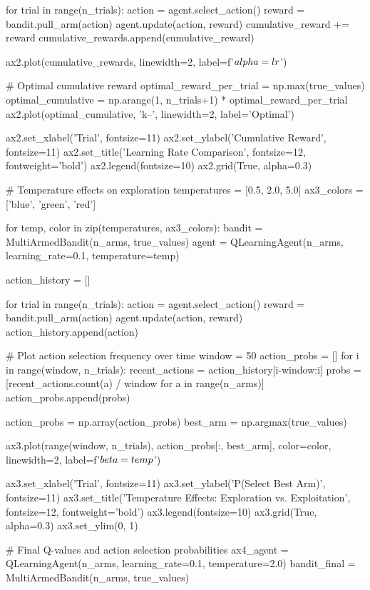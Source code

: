 \documentclass[a4paper, 11pt]{article}
\begin{document}
{{\begin{pycode}
    for trial in range(n_trials):
        action = agent.select_action()
        reward = bandit.pull_arm(action)
        agent.update(action, reward)
        cumulative_reward += reward
        cumulative_rewards.append(cumulative_reward)

    ax2.plot(cumulative_rewards, linewidth=2, label=f'$\\alpha={lr}$')

# Optimal cumulative reward
optimal_reward_per_trial = np.max(true_values)
optimal_cumulative = np.arange(1, n_trials+1) * optimal_reward_per_trial
ax2.plot(optimal_cumulative, 'k--', linewidth=2, label='Optimal')

ax2.set_xlabel('Trial', fontsize=11)
ax2.set_ylabel('Cumulative Reward', fontsize=11)
ax2.set_title('Learning Rate Comparison', fontsize=12, fontweight='bold')
ax2.legend(fontsize=10)
ax2.grid(True, alpha=0.3)

# Temperature effects on exploration
temperatures = [0.5, 2.0, 5.0]
ax3_colors = ['blue', 'green', 'red']

for temp, color in zip(temperatures, ax3_colors):
    bandit = MultiArmedBandit(n_arms, true_values)
    agent = QLearningAgent(n_arms, learning_rate=0.1, temperature=temp)

    action_history = []

    for trial in range(n_trials):
        action = agent.select_action()
        reward = bandit.pull_arm(action)
        agent.update(action, reward)
        action_history.append(action)

    # Plot action selection frequency over time
    window = 50
    action_probs = []
    for i in range(window, n_trials):
        recent_actions = action_history[i-window:i]
        probs = [recent_actions.count(a) / window for a in range(n_arms)]
        action_probs.append(probs)

    action_probs = np.array(action_probs)
    best_arm = np.argmax(true_values)

    ax3.plot(range(window, n_trials), action_probs[:, best_arm],
             color=color, linewidth=2, label=f'$\\beta={temp}$')

ax3.set_xlabel('Trial', fontsize=11)
ax3.set_ylabel('P(Select Best Arm)', fontsize=11)
ax3.set_title('Temperature Effects: Exploration vs. Exploitation', fontsize=12, fontweight='bold')
ax3.legend(fontsize=10)
ax3.grid(True, alpha=0.3)
ax3.set_ylim(0, 1)

# Final Q-values and action selection probabilities
ax4_agent = QLearningAgent(n_arms, learning_rate=0.1, temperature=2.0)
bandit_final = MultiArmedBandit(n_arms, true_values)


\end{pycode}}}
\end{document}
